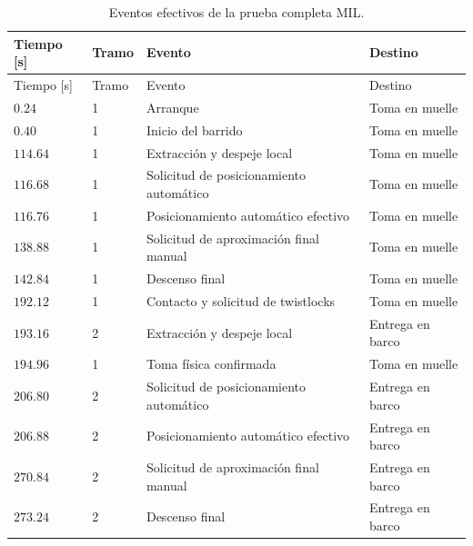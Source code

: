 \documentclass[a4paper,10pt,onecolumn,journal]{ieeeconf}
\numberwithin{equation}{section}
\begin{document}
\begin{longtable}{C{1.6cm} C{1.0cm} L{6.4cm} L{4.4cm}}

\caption{Eventos efectivos de la prueba completa MIL.}\label{tab:cronologia_completa_MIL}\\

\toprule Tiempo [s] & Tramo & Evento & Destino\\\midrule\endfirsthead

\toprule Tiempo [s] & Tramo & Evento & Destino\\\midrule\endhead

$0.24$ & 1 & Arranque & Toma en muelle\\

$0.40$ & 1 & Inicio del barrido & Toma en muelle\\

$114.64$ & 1 & Extracción y despeje local & Toma en muelle\\

$116.68$ & 1 & Solicitud de posicionamiento automático & Toma en muelle\\

$116.76$ & 1 & Posicionamiento automático efectivo & Toma en muelle\\

$138.88$ & 1 & Solicitud de aproximación final manual & Toma en muelle\\

$142.84$ & 1 & Descenso final & Toma en muelle\\

$192.12$ & 1 & Contacto y solicitud de twistlocks & Toma en muelle\\

$193.16$ & 2 & Extracción y despeje local & Entrega en barco\\

$194.96$ & 1 & Toma física confirmada & Toma en muelle\\

$206.80$ & 2 & Solicitud de posicionamiento automático & Entrega en barco\\

$206.88$ & 2 & Posicionamiento automático efectivo & Entrega en barco\\

$270.84$ & 2 & Solicitud de aproximación final manual & Entrega en barco\\

$273.24$ & 2 & Descenso final & Entrega en barco\\


\end{longtable}
\end{document}
